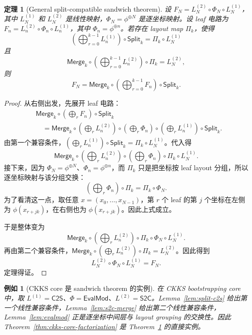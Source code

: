 \documentclass[UTF8,11pt]{article}
\newcommand{\Split}{\mathsf{Split}}
\newcommand{\Merge}{\mathsf{Merge}}
\newcommand{\CtwoS}{\mathsf{C2S}}
\newcommand{\StwoC}{\mathsf{S2C}}
\newcommand{\EvalMod}{\mathsf{EvalMod}}
\theoremstyle{definition}
\theoremstyle{plain}
\newtheorem{theorem}{定理}
\newtheorem{example}{例如}
\begin{document}
\begin{theorem}[General split-compatible sandwich theorem]
\label{thm:general-sandwich}
设 \(F_N=L_N^{(2)}\circ\Phi_N\circ L_N^{(1)}\)，其中 \(L_N^{(1)}\) 和 \(L_N^{(2)}\) 是线性映射，\(\Phi_N=\phi^{\oplus N}\) 是逐坐标映射。设 leaf 电路为 \(F_n=L_n^{(2)}\circ\Phi_n\circ L_n^{(1)}\)，其中 \(\Phi_n=\phi^{\oplus n}\)。若存在 layout map \(\Pi_k\)，使得
\[
\left(\bigoplus_{r=0}^{k-1}L_n^{(1)}\right)\circ\Split_k
=
\Pi_k\circ L_N^{(1)}
\]
且
\[
\Merge_k\circ
\left(\bigoplus_{r=0}^{k-1}L_n^{(2)}\right)
\circ\Pi_k
=
L_N^{(2)},
\]
则
\[
F_N
=
\Merge_k\circ
\left(\bigoplus_{r=0}^{k-1}F_n\right)
\circ\Split_k.
\]
\end{theorem}

\begin{proof}
从右侧出发，先展开 leaf 电路：
\[
\begin{aligned}
&\Merge_k\circ
\left(\bigoplus_r F_n\right)
\circ\Split_k\\
&\quad=
\Merge_k\circ
\left(\bigoplus_r L_n^{(2)}\right)
\circ
\left(\bigoplus_r \Phi_n\right)
\circ
\left(\bigoplus_r L_n^{(1)}\right)
\circ\Split_k.
\end{aligned}
\]
由第一个兼容条件，\((\bigoplus_r L_n^{(1)})\circ\Split_k=\Pi_k\circ L_N^{(1)}\)。代入得
\[
\Merge_k\circ
\left(\bigoplus_r L_n^{(2)}\right)
\circ
\left(\bigoplus_r \Phi_n\right)
\circ
\Pi_k
\circ L_N^{(1)}.
\]
接下来，因为 \(\Phi_N=\phi^{\oplus N}\)、\(\Phi_n=\phi^{\oplus n}\)，而 \(\Pi_k\) 只是把坐标按 leaf layout 分组，所以逐坐标映射与该分组交换：
\[
\left(\bigoplus_r\Phi_n\right)\circ\Pi_k
=
\Pi_k\circ\Phi_N.
\]
为了看清这一点，取任意 \(x=(x_0,\ldots,x_{N-1})\)，第 \(r\) 个 leaf 的第 \(j\) 个坐标在左侧为 \(\phi(x_{r+jk})\)，在右侧也为 \(\phi(x_{r+jk})\)。因此上式成立。

于是整体变为
\[
\Merge_k\circ
\left(\bigoplus_r L_n^{(2)}\right)
\circ
\Pi_k
\circ
\Phi_N
\circ L_N^{(1)}.
\]
再由第二个兼容条件，\(\Merge_k\circ(\bigoplus_r L_n^{(2)})\circ\Pi_k=L_N^{(2)}\)。因此得到
\[
L_N^{(2)}\circ\Phi_N\circ L_N^{(1)}=F_N.
\]
定理得证。
\end{proof}

\begin{example}[CKKS core 是 sandwich theorem 的实例]
在 CKKS bootstrapping core 中，取 \(L^{(1)}=\CtwoS\)、\(\Phi=\EvalMod\)、\(L^{(2)}=\StwoC\)。Lemma~\ref{lem:split-c2s} 给出第一个线性兼容条件，Lemma~\ref{lem:s2c-merge} 给出第二个线性兼容条件，Lemma~\ref{lem:evalmod} 正是逐坐标中间层与 layout grouping 的交换性。因此 Theorem~\ref{thm:ckks-core-factorization} 是 Theorem~\ref{thm:general-sandwich} 的直接实例。
\end{example}
\end{document}

